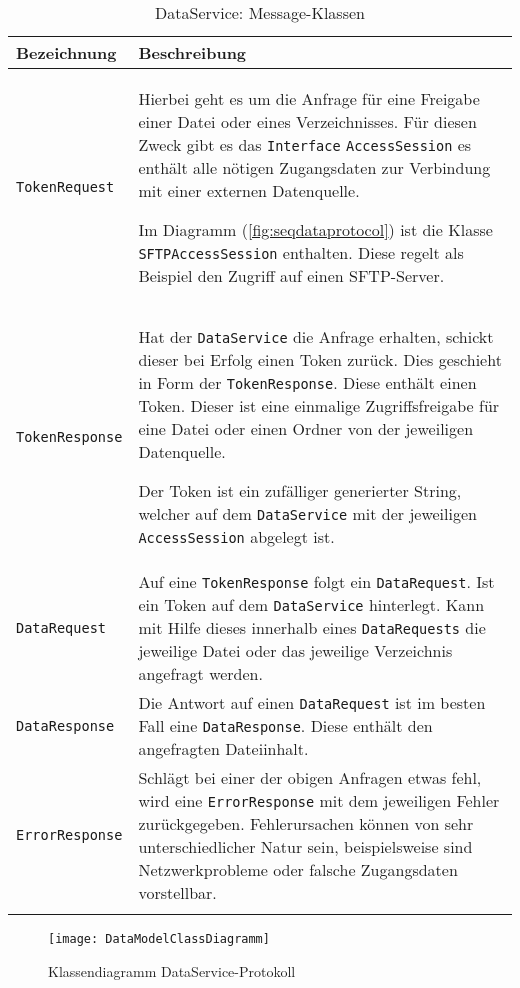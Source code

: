 \begin{longtable}{|p{4cm}| p{8cm}|}
  \hline
    \textbf{Bezeichnung} & \textbf{Beschreibung}\\\hline
    \texttt{TokenRequest} & Hierbei geht es um die Anfrage für eine Freigabe einer Datei oder eines Verzeichnisses. Für diesen Zweck gibt es das \texttt{Interface} \texttt{AccessSession} es enthält alle nötigen Zugangsdaten zur Verbindung mit einer externen Datenquelle. \newline
    
    Im Diagramm (\autoref{fig:seqdataprotocol}) ist die Klasse \texttt{SFTPAccessSession} enthalten. Diese regelt als Beispiel den Zugriff auf einen SFTP-Server.
    \\\hline
    \texttt{TokenResponse} &    
    Hat der \texttt{DataService} die Anfrage erhalten, schickt dieser bei Erfolg einen Token zurück. Dies geschieht in Form der \texttt{TokenResponse}. Diese enthält einen \gls{Token}. Dieser ist eine einmalige Zugriffsfreigabe für eine Datei oder einen Ordner von der jeweiligen Datenquelle.\newline
    
    
    Der \gls{Token} ist ein zufälliger generierter String, welcher auf dem \texttt{DataService} mit der jeweiligen \texttt{AccessSession} abgelegt ist.\\\hline
    \texttt{DataRequest} & Auf eine \texttt{TokenResponse} folgt ein \texttt{DataRequest}. Ist ein \gls{Token} auf dem \texttt{DataService} hinterlegt. Kann mit Hilfe dieses innerhalb eines \texttt{DataRequests} die jeweilige Datei oder das jeweilige Verzeichnis angefragt werden. \\\hline
    \texttt{DataResponse} & Die Antwort auf einen \texttt{DataRequest} ist im besten Fall eine \texttt{DataResponse}. Diese enthält den angefragten Dateiinhalt. \\\hline
    \texttt{ErrorResponse} & Schlägt bei einer der obigen Anfragen etwas fehl, wird eine \texttt{ErrorResponse} mit dem jeweiligen Fehler zurückgegeben. Fehlerursachen können von sehr unterschiedlicher Natur sein, beispielsweise sind Netzwerkprobleme oder falsche Zugangsdaten vorstellbar.\\\hline
        \caption{DataService: Message-Klassen}
    \label{dataservice-bodies}
\end{longtable}


    \begin{figure}[H]
    \centering
    \texttt{[image: DataModelClassDiagramm]}
    \caption{Klassendiagramm DataService-Protokoll}
    \label{fig:dataclass}
    \end{figure}

